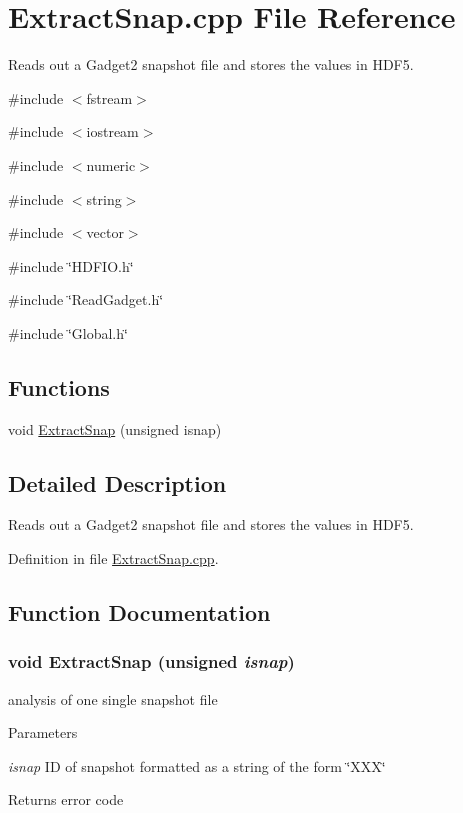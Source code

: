 \section{ExtractSnap.cpp File Reference}
\label{ExtractSnap_8cpp}


Reads out a Gadget2 snapshot file and stores the values in HDF5.  


{\ttfamily \#include $<$fstream$>$}\par
{\ttfamily \#include $<$iostream$>$}\par
{\ttfamily \#include $<$numeric$>$}\par
{\ttfamily \#include $<$string$>$}\par
{\ttfamily \#include $<$vector$>$}\par
{\ttfamily \#include \char`\"{}HDFIO.h\char`\"{}}\par
{\ttfamily \#include \char`\"{}ReadGadget.h\char`\"{}}\par
{\ttfamily \#include \char`\"{}Global.h\char`\"{}}\par
\subsection*{Functions}
\begin{DoxyCompactItemize}
\item 
void \hyperlink{ExtractSnap_8cpp_a153efd2d127e586a6fbb2a050f440c06}{ExtractSnap} (unsigned isnap)
\end{DoxyCompactItemize}


\subsection{Detailed Description}
Reads out a Gadget2 snapshot file and stores the values in HDF5. 

Definition in file \hyperlink{ExtractSnap_8cpp_source}{ExtractSnap.cpp}.



\subsection{Function Documentation}
\subsubsection[{ExtractSnap}]{\setlength{\rightskip}{0pt plus 5cm}void ExtractSnap (unsigned {\em isnap})}\label{ExtractSnap_8cpp_a153efd2d127e586a6fbb2a050f440c06}
analysis of one single snapshot file 
\begin{DoxyParams}{Parameters}
\item[{\em isnap}]ID of snapshot formatted as a string of the form \char`\"{}XXX\char`\"{} \end{DoxyParams}
\begin{DoxyReturn}{Returns}
error code 
\end{DoxyReturn}


